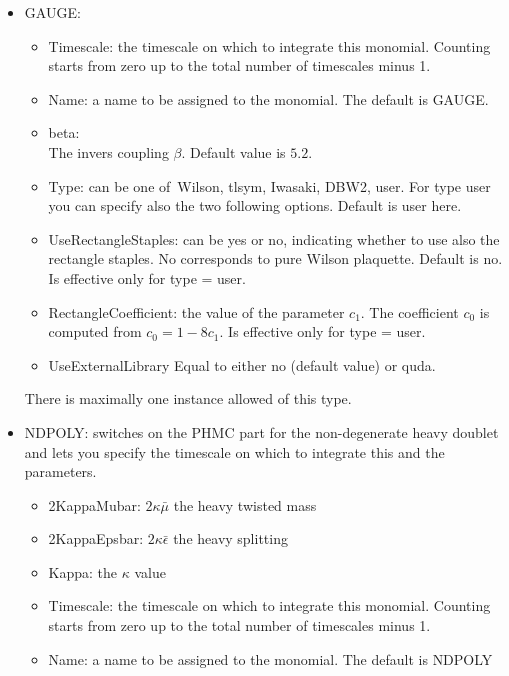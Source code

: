 \begin{itemize}
%
\item {\ttfamily GAUGE}: 
  \begin{itemize}
  \item {\ttfamily Timescale}: the timescale on which to integrate
    this monomial. Counting starts from zero up to the total number of
    timescales minus 1.
  \item {\ttfamily Name}: a name to be assigned to the monomial. The
    default is {\ttfamily GAUGE}.

  \item {\ttfamily beta}:\\
    The invers coupling $\beta$. Default value is $5.2$.
    
  \item {\ttfamily Type}: can be one of\ {\ttfamily Wilson, tlsym,
      Iwasaki, DBW2, user}. For type user you can specify also the two
    following options. Default is {\ttfamily user} here.
  \item {\ttfamily UseRectangleStaples}: can be yes or no, indicating
    whether to use also the rectangle staples. No corresponds to pure
    Wilson plaquette. Default is no. Is effective only for {\ttfamily
      type = user}.
  \item {\ttfamily RectangleCoefficient}: the value of the parameter
    $c_1$. The coefficient $c_0$ is computed from $c_0 = 1-8c_1$. Is
    effective only for {\ttfamily type = user}.
   \item {\ttfamily UseExternalLibrary} 
  Equal to either {\ttfamily no} (default value) or {\ttfamily quda}.
  \end{itemize}
  There is maximally one instance allowed of this type.
  
  
\item {\ttfamily NDPOLY}: switches
  on the PHMC part for the non-degenerate heavy doublet and lets you
  specify the timescale on which to integrate this and the parameters.
  \begin{itemize}
  \item {\ttfamily 2KappaMubar}: $2\kappa\bar\mu$ the heavy twisted mass
  \item {\ttfamily 2KappaEpsbar}: $2\kappa\bar\epsilon$ the heavy
    splitting
  \item {\ttfamily Kappa}: the $\kappa$ value
  \item {\ttfamily Timescale}: the timescale on which to integrate
    this monomial. Counting starts from zero up to the total number of
    timescales minus 1.

  \item {\ttfamily Name}: a name to be assigned to the monomial. The
    default is {\ttfamily NDPOLY}


\end{itemize}
\end{itemize}
